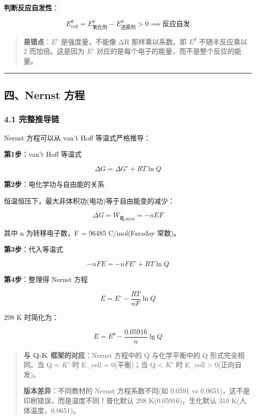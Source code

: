 \textbf{判断反应自发性}：

\[
E_{\text{cell}}^\theta = E^\theta_{\text{氧化剂}} - E^\theta_{\text{还原剂}} > 0 \implies \text{反应自发}
\]

\begin{quote}
\textbf{易错点}：\(E^{\circ}\) 是强度量，不能像 ΔH 那样乘以系数。即 \(E^\theta\) 不随半反应乘以 2 而加倍。这是因为 \(E^{\circ}\) 对应的是每个电子的能量，而不是整个反应的能量。
\end{quote}

\begin{center}\rule{0.5\linewidth}{0.5pt}\end{center}

\subsection{四、Nernst 方程}\label{ux56dbnernst-ux65b9ux7a0b}

\subsubsection{4.1 完整推导链}\label{ux5b8cux6574ux63a8ux5bfcux94fe}

Nernst 方程可以从 van't Hoff 等温式严格推导：

\textbf{第1步}：van't Hoff 等温式

\[\Delta G = \Delta G^\circ + RT\ln Q\]

\textbf{第2步}：电化学功与自由能的关系

恒温恒压下，最大非体积功(电功)等于自由能变的减少：

\[\Delta G = W_{\text{电,max}} = -nEF\]

其中 n 为转移电子数，F = 96485 C/mol(Faraday 常数)。

\textbf{第3步}：代入等温式

\[-nFE = -nFE^\circ + RT\ln Q\]

\textbf{第4步}：整理得 Nernst 方程

\[\boxed{E = E^\circ - \frac{RT}{nF}\ln Q}\]

298 K 时简化为：

\[E = E^\theta - \frac{0.05916}{n}\lg Q\]

\begin{quote}
\textbf{与 Q-K 框架的对应}：Nernst 方程中的 Q 与化学平衡中的 Q 形式完全相同。当 Q = \(K^{\circ}\) 时 E\_cell = 0(平衡)；当 Q \textless{} \(K^{\circ}\) 时 E\_cell \textgreater{} 0(正向自发)。

\textbf{版本差异}：不同教材的 Nernst 方程系数不同(如 0.0591 vs 0.0651)，这不是印刷错误，而是温度不同！普化默认 298 K(0.05916)，生化默认 310 K(人体温度，0.0651)。
\end{quote}


